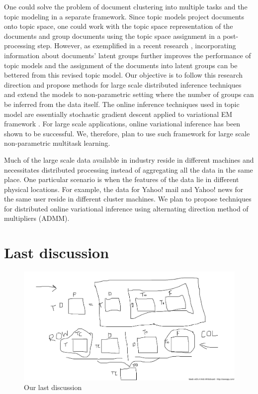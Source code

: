 \documentclass[10pts,fleqn]{article}
\begin{document}
One could solve the problem of document clustering into multiple
tasks and the topic modeling in a separate framework. Since topic models project documents
onto topic space, one could work with the topic space representation of the documents
and group documents using the topic space assignment
in a post-processing step. However, as exemplified in a recent research
\cite{xixi13}, incorporating information about documents' latent
groups further improves the performance of topic models and the assignment
of the documents into latent groups can be bettered from this
revised topic model.
Our objective is to follow this research direction and propose methods for
large scale distributed inference techniques and extend the models to non-parametric
setting where the number of groups can be inferred from the data itself.
The online inference techniques used in topic model are essentially
stochastic gradient descent applied to variational EM framework
\cite{hobb10,wapb11}. For large scale applications, online variational
inference has been shown to be successful. We, therefore, plan to use such
framework for large scale non-parametric multitask learning.

Much of the large scale data available in industry reside in different
machines and necessitates distributed processing instead
of aggregating all the data in the same place. One particular scenario
is when the features of the data lie in different physical locations. For example, the data for
Yahoo! mail and Yahoo! news for the same user reside in different
cluster machines. We plan to propose techniques for distributed online variational inference
using alternating direction method of multipliers (ADMM)\cite{bopc11}.


\section{Last discussion}
\begin{figure}[!htbp]
	\centering
	\includegraphics[width=1.05\textwidth]{50.png}
	\caption{Our last discussion}
\end{figure}



\end{document}
